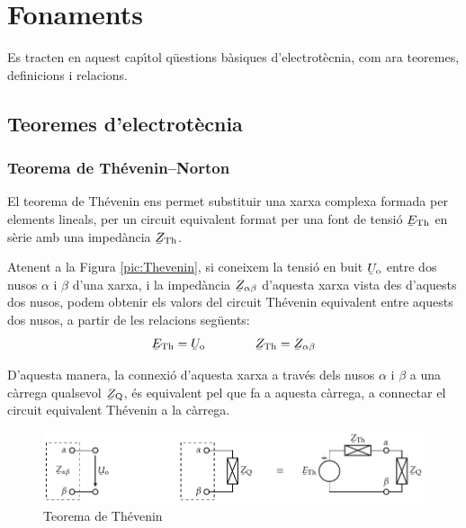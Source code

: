 \chapter{Fonaments}

 Es tracten en aquest cap\'{\i}tol q\"{u}estions b\`{a}siques
d'electrot\`{e}cnia, com ara teoremes, definicions i relacions.

\section{Teoremes d'electrot\`{e}cnia}\label{sec:teoremes}

\subsection{\texorpdfstring{Teorema de Th\'{e}venin--Norton}{Teorema de
            Th\'{e}venin-Norton}}\label{sec:T_N}

El teorema de Th\'{e}venin ens permet
substituir una xarxa complexa formada per elements lineals, per un
circuit equivalent format per una font de tensi\'{o} $\cmplx{E}\ped{Th}$
en s\`{e}rie amb una imped\`{a}ncia $\cmplx{Z}\ped{Th}$.

Atenent a la Figura \vref{pic:Thevenin}, si coneixem la tensi\'{o} en
buit $\cmplx{U}\ped{o}$ entre dos nusos $\alpha$ i $\beta$ d'una
xarxa, i la imped\`{a}ncia $\cmplx{Z}_{\alpha\beta}$ d'aquesta xarxa
vista des d'aquests dos nusos, podem obtenir els valors del circuit
Th\'{e}venin equivalent entre aquests dos nusos, a partir de les
relacions seg\"{u}ents:
\begin{equation}
   \cmplx{E}\ped{Th} = \cmplx{U}\ped{o} \qquad\qquad  \cmplx{Z}\ped{Th} = \cmplx{Z}_{\alpha\beta}
\end{equation}

D'aquesta manera, la connexi\'{o} d'aquesta xarxa a trav\'{e}s dels nusos
$\alpha$ i $\beta$ a una c\`{a}rrega qualsevol $\cmplx{Z}\ped{Q}$, \'{e}s
equivalent pel que fa a aquesta c\`{a}rrega, a connectar el circuit
equivalent Th\'{e}venin a la c\`{a}rrega.
\begin{figure}[htb]
\centering
    \includegraphics{Imatges/Cap-Fonaments-Thevenin.pdf}
\caption{Teorema de Th\'{e}venin} \label{pic:Thevenin}
\end{figure}

